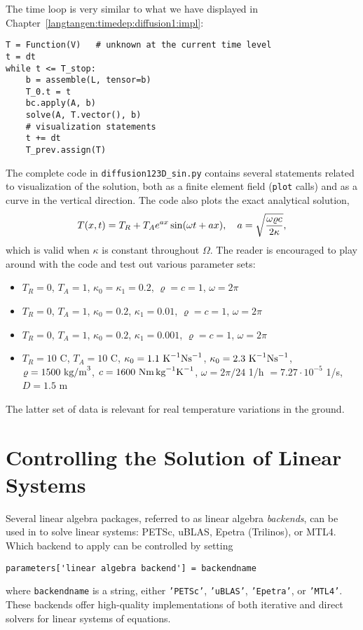 The time loop is very similar to what we have displayed in
Chapter~\ref{langtangen:timedep:diffusion1:impl}:
\begin{Verbatim}[fontsize=\fontsize{10pt}{10pt},tabsize=8,baselinestretch=1.05,
fontfamily=tt,xleftmargin=7mm]
T = Function(V)   # unknown at the current time level
t = dt
while t <= T_stop:
    b = assemble(L, tensor=b)
    T_0.t = t
    bc.apply(A, b)
    solve(A, T.vector(), b)
    # visualization statements
    t += dt
    T_prev.assign(T)
\end{Verbatim}
\noindent
The complete code in {\fontsize{12pt}{12pt}\verb!diffusion123D_sin.py!} contains several
statements related to visualization of the solution, both as a
finite element field ({\fontsize{12pt}{12pt}\texttt{plot}} calls) and as a curve in the
vertical direction. The code also plots the exact analytical solution,
\[
T(x,t) = T_R + T_Ae^{ax}\sin (\omega t + ax),\quad a =\sqrt{\omega\varrho c\over 2\kappa},
\]
which is valid when $\kappa$ is constant throughout $\Omega$. 
The reader is encouraged
to play around with the code and test out various parameter sets:
\begin{itemize}
\item $T_R=0$, $T_A=1$, $\kappa_0 = \kappa_1=0.2$, $\varrho = c = 1$, $\omega = 2\pi$
\item $T_R=0$, $T_A=1$, $\kappa_0=0.2$, $\kappa_1=0.01$, $\varrho = c = 1$, $\omega = 2\pi$
\item $T_R=0$, $T_A=1$, $\kappa_0=0.2$, $\kappa_1=0.001$, $\varrho = c = 1$, $\omega = 2\pi$
\item $T_R=10$ C, $T_A=10$ C, $\kappa_0= 1.1 \hbox{ K}^{-1}\hbox{Ns}^{-1}$,
$\kappa_0= 2.3 \hbox{ K}^{-1}\hbox{Ns}^{-1}$, 
$\varrho = 1500\hbox{ kg/m}^3$, 
$c = 1600\hbox{ Nm\,kg}^{-1}\hbox{K}^{-1}$, 
$\omega = 2\pi/24$ 1/h  $= 7.27\cdot 10^{-5}$ 1/s, $D=1.5$ m
\end{itemize}
The latter set of data is relevant for real temperature variations in the
ground.


\section{Controlling the Solution of Linear Systems}
\label{langtangen:linsys}

Several linear algebra packages, referred to as
linear algebra \emph{backends}, can be used in \fenics{} to solve
linear systems:
PETSc, uBLAS, Epetra (Trilinos), or MTL4.
Which backend to apply can be controlled by setting
\begin{Verbatim}[fontsize=\fontsize{10pt}{10pt},tabsize=8,baselinestretch=1.05,
fontfamily=tt,xleftmargin=7mm]
parameters['linear algebra backend'] = backendname
\end{Verbatim}
\noindent 
where {\fontsize{12pt}{12pt}\texttt{backendname}} is a string, either {\fontsize{12pt}{12pt}\texttt{'PETSc'}},
{\fontsize{12pt}{12pt}\texttt{'uBLAS'}}, {\fontsize{12pt}{12pt}\texttt{'Epetra'}}, or {\fontsize{12pt}{12pt}\texttt{'MTL4'}}.
These backends offer high-quality implementations of both iterative
and direct solvers for linear systems of equations.

